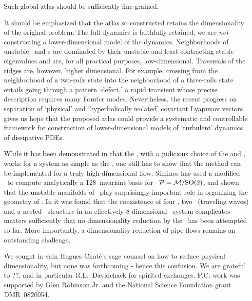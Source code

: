 Such global atlas should be sufficiently fine-grained.

It should be emphasized that the atlas so constructed retains the
dimensionality of the original problem. The full dynamics is faithfully
retained, we are \emph{not} constructing a lower-dimensional model of the
dynamics. Neighborhoods of unstable \eqva\ and \po s are dominated by
their unstable and least contracting stable eigenvalues and are, for all
practical purposes, low-dimensional. Traversals of the ridges are,
however, higher dimensional. For example, crossing from the neighborhood
of a two-rolls state into the neighborhood of a three-rolls state entails
going through a pattern `defect,' a rapid transient whose precise
description requires many Fourier modes. Nevertheless, the recent
progress on separation of `physical' and `hyperbolically isolated'
covariant Lyapunov
vectors gives us
hope that the proposed atlas could provide a systematic and controllable
framework for construction of lower-dimensional models of `turbulent'
dynamics of dissipative PDEs.

While it has been demonstrated in   that the \mframes, with a judicious choice of the {\template} and {\PoincSec}, works for a system as simple as the \cLf, one still has to show that the method can be implemented for a truly high-dimensional flow. Siminos has used a modified \mframes\ to compute analytically a 128\dmn\ invariant basis for \reducedsp\ ${\cal P} = {\cal M}/\textrm{SO}(2)$, and shown that the unstable manifolds of \reqva\ play surprisingly important role in organizing the geometry of \KS. In  it was found that the coexistence of four \eqva, two \reqva\ (traveling waves) and a nested \fixedsp\ structure in an effectively $8$-dimensional \KS\ system complicates matters sufficiently that no dimensionality reduction by the \mslices\ has been attempted so far. More importantly, a dimensionality reduction of pipe flows remains an outstanding challenge.


	\medskip
We sought in vain Hugues Chat\'e's sage counsel on how to reduce
physical dimensionality, but none was forthcoming - hence this
confusion.
We are grateful to
??,
and in particular R.L.~Davidchack
for spirited exchanges.
P.C. work was supported by  Glen Robinson Jr.
and the National Science Foundation grant
DMR~0820054. 	

